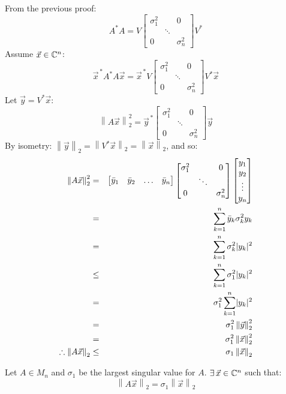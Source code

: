 \documentclass[letterpaper,12pt,fleqn]{article}
\renewcommand{\o}{\sigma}
\newcommand{\vx}{\vec{x}}
\newcommand{\vy}{\vec{y}}
\newcommand{\norm}[1]{\left\lVert#1\right\rVert}
\begin{document}
\begin{theproof}
  From the previous proof:
  \[A^*A=V\begin{bmatrix} \o_1^2 & & 0 \\ & \ddots & \\ 0 & & \o_n^2
  \end{bmatrix}V^*\]
  Assume $\vx\in\C^n$:
  \[\vx^{\,*}A^*A\vx=\vx^{\,*}V\begin{bmatrix}
  \o_1^2 & & 0 \\ & \ddots & \\ 0 & & \o_n^2
  \end{bmatrix}V^*\vx\]
  Let $\vy=V^*\vx$:
  \[\norm{A\vx}_2^2=\vy^{\,*}\begin{bmatrix}
    \o_1^2 & & 0 \\ & \ddots & \\ 0 & & \o_n^2
  \end{bmatrix}\vy\]
  By isometry: $\norm{\vy}_2=\norm{V^*\vx}_2=\norm{\vx}_2$, and so:
  \begin{eqnarray*}
    \norm{A\vx}_2^2 &=& \begin{bmatrix}
      \bar{y}_1 & \bar{y}_2 & \ldots & \bar{y}_n \end{bmatrix}
    \begin{bmatrix} \o_1^2 & & 0 \\ & \ddots & \\ 0 & & \o_n^2 \end{bmatrix}
    \begin{bmatrix} y_1 \\ y_2 \\ \vdots \\ y_n \end{bmatrix} \\
    &=& \sum_{k=1}^n\bar{y}_k\o_k^2y_k \\
    &=& \sum_{k=1}^n\o_k^2\abs{y_k}^2 \\
    &\le& \sum_{k=1}^n\o_1^2\abs{y_k}^2 \\
    &=& \o_1^2\sum_{k=1}^n\abs{y_k}^2 \\
    &=& \o_1^2\norm{\vy}_2^2 \\
    &=& \o_1^2\norm{\vx}_2^2 \\
    \therefore\norm{A\vx}_2 &\le& \o_1\norm{\vx}_2
  \end{eqnarray*}
\end{theproof}

\begin{lemma}
  Let $A\in M_n$ and $\o_1$ be the largest singular value for $A$.
  $\exists\,\vx\in\C^n$ such that:
  \[\norm{A\vx}_2=\o_1\norm{\vx}_2\]
\end{lemma}
\end{document}
